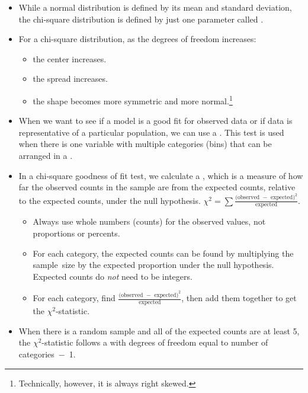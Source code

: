 \begin{itemize}

\item While a normal distribution is defined by its mean and standard deviation, the chi-square distribution is defined by just one parameter called .  
\item For a chi-square distribution, as the degrees of freedom increases:  \vspace{-1mm}
\begin{itemize}
\setlength{\itemsep}{0mm}
\item the center increases.\item  the spread increases.  
\item the shape becomes more symmetric and more normal.\footnote{Technically, however, it is always right skewed.}
\end{itemize}

\item When we want to see if a model is a good fit for observed data or if data is representative of a particular population, we can use a .  This test is used when there is one variable with multiple categories (bins) that can be arranged in a .

\item In a chi-square goodness of fit test, we calculate a , which is a measure of how far the observed counts in the sample are from the expected counts, relative to the expected counts, under the null hypothesis. $\chi^2 =\sum{ \frac{\text{(observed } - \text{ expected})^2}{\text{expected}}}$.
\begin{itemize}\vspace{-1mm}
\item Always use whole numbers (counts) for the observed values, not proportions or percents.
\item For each category, the expected counts can be found by multiplying the sample~size by the expected proportion under the null hypothesis.  Expected counts do \emph{not} need to be integers.  
\item For each category, find $\frac{\text{(observed } - \text{ expected})^2}{\text{expected}}$, then add them together to get the $\chi^2$-statistic.
\end{itemize}

\item When there is a random sample and all of the expected counts are at least 5, the $\chi^2$-statistic follows a  with degrees of freedom equal to number of \mbox{categories $-$ 1.}


\end{itemize}
